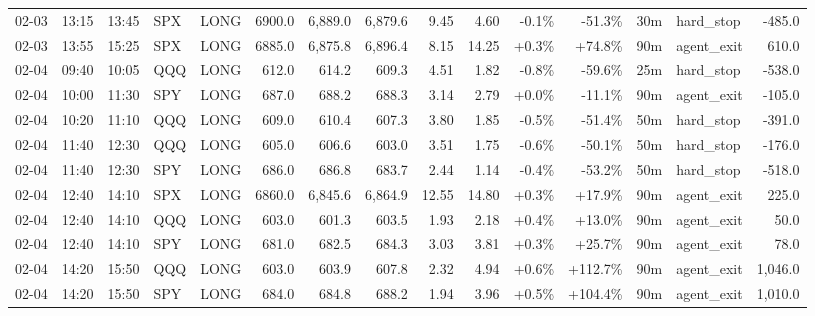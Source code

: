 \documentclass[11pt,a4paper,twoside]{article}
\begin{document}
\begin{landscape}
\begin{center}
\begin{longtable}{>{\color{txtmain}}l l l l l r r r r r r r r >{\color{txtmain}}l r}
02-03 & 13:15 & 13:45 & SPX & LONG & 6900.0 & 6,889.0 & 6,879.6 & 9.45 & 4.60 & \textcolor{lossred}{-0.1\%} & \textcolor{lossred}{-51.3\%} & 30m & hard\_stop & \textcolor{lossred}{-485.0} \\
02-03 & 13:55 & 15:25 & SPX & LONG & 6885.0 & 6,875.8 & 6,896.4 & 8.15 & 14.25 & \textcolor{wingreen}{+0.3\%} & \textcolor{wingreen}{+74.8\%} & 90m & agent\_exit & \textcolor{wingreen}{610.0} \\
02-04 & 09:40 & 10:05 & QQQ & LONG & 612.0 & 614.2 & 609.3 & 4.51 & 1.82 & \textcolor{lossred}{-0.8\%} & \textcolor{lossred}{-59.6\%} & 25m & hard\_stop & \textcolor{lossred}{-538.0} \\
02-04 & 10:00 & 11:30 & SPY & LONG & 687.0 & 688.2 & 688.3 & 3.14 & 2.79 & \textcolor{wingreen}{+0.0\%} & \textcolor{lossred}{-11.1\%} & 90m & agent\_exit & \textcolor{lossred}{-105.0} \\
02-04 & 10:20 & 11:10 & QQQ & LONG & 609.0 & 610.4 & 607.3 & 3.80 & 1.85 & \textcolor{lossred}{-0.5\%} & \textcolor{lossred}{-51.4\%} & 50m & hard\_stop & \textcolor{lossred}{-391.0} \\
02-04 & 11:40 & 12:30 & QQQ & LONG & 605.0 & 606.6 & 603.0 & 3.51 & 1.75 & \textcolor{lossred}{-0.6\%} & \textcolor{lossred}{-50.1\%} & 50m & hard\_stop & \textcolor{lossred}{-176.0} \\
02-04 & 11:40 & 12:30 & SPY & LONG & 686.0 & 686.8 & 683.7 & 2.44 & 1.14 & \textcolor{lossred}{-0.4\%} & \textcolor{lossred}{-53.2\%} & 50m & hard\_stop & \textcolor{lossred}{-518.0} \\
02-04 & 12:40 & 14:10 & SPX & LONG & 6860.0 & 6,845.6 & 6,864.9 & 12.55 & 14.80 & \textcolor{wingreen}{+0.3\%} & \textcolor{wingreen}{+17.9\%} & 90m & agent\_exit & \textcolor{wingreen}{225.0} \\
02-04 & 12:40 & 14:10 & QQQ & LONG & 603.0 & 601.3 & 603.5 & 1.93 & 2.18 & \textcolor{wingreen}{+0.4\%} & \textcolor{wingreen}{+13.0\%} & 90m & agent\_exit & \textcolor{wingreen}{50.0} \\
02-04 & 12:40 & 14:10 & SPY & LONG & 681.0 & 682.5 & 684.3 & 3.03 & 3.81 & \textcolor{wingreen}{+0.3\%} & \textcolor{wingreen}{+25.7\%} & 90m & agent\_exit & \textcolor{wingreen}{78.0} \\
02-04 & 14:20 & 15:50 & QQQ & LONG & 603.0 & 603.9 & 607.8 & 2.32 & 4.94 & \textcolor{wingreen}{+0.6\%} & \textcolor{wingreen}{+112.7\%} & 90m & agent\_exit & \textcolor{wingreen}{1,046.0} \\
02-04 & 14:20 & 15:50 & SPY & LONG & 684.0 & 684.8 & 688.2 & 1.94 & 3.96 & \textcolor{wingreen}{+0.5\%} & \textcolor{wingreen}{+104.4\%} & 90m & agent\_exit & \textcolor{wingreen}{1,010.0} \\

\end{longtable}
\end{center}
\end{landscape}
\end{document}

